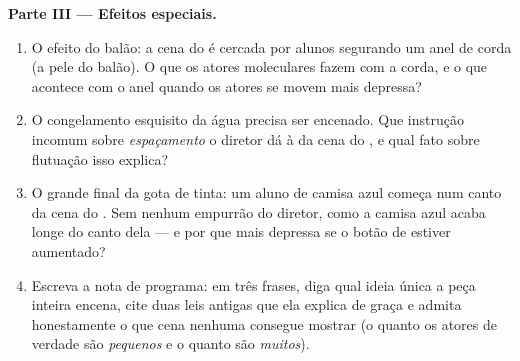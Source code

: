 \begin{problem}
\medskip\noindent\textbf{Parte III --- Efeitos especiais.}
\begin{enumerate}[resume]
  \item O efeito do balão: a cena do  é cercada por alunos
        segurando um anel de corda (a pele do balão). O que os atores
        moleculares fazem com a corda, e o que acontece com o anel
        quando os atores se movem mais depressa?
  \item O congelamento esquisito da água precisa ser encenado. Que
        instrução incomum sobre \emph{espaçamento} o diretor dá à
         da cena do , e qual fato sobre flutuação isso
        explica?
  \item O grande final da gota de tinta: um aluno de camisa azul
        começa num canto da cena do \emph{}. Sem nenhum
        empurrão do diretor, como a camisa azul acaba longe do canto
        dela --- e por que mais depressa se o botão de  estiver
        aumentado?
  \item Escreva a nota de programa: em três frases, diga qual ideia
        única a peça inteira encena, cite duas leis antigas que ela
        explica de graça e admita honestamente o que cena nenhuma
        consegue mostrar (o quanto os atores de verdade são
        \emph{pequenos} e o quanto são \emph{muitos}).
\end{enumerate}
\end{problem}
